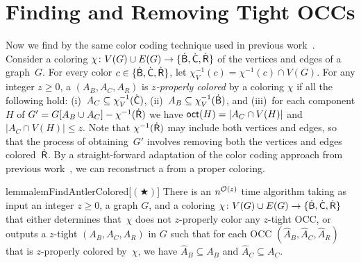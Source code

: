 \section{Finding and Removing Tight OCCs} \label{sec:tight:occs}


Now we find  by the same color coding technique used in previous work~\cite{DonkersJ24}.
Consider a coloring 
$\chi\colon V(G) \cup E(G) \to \{\mathsf{\dot{B}}, \mathsf{\dot{C}}, \mathsf{\dot{R}}\}$ of the vertices and edges of a graph~$G$.
For every color $c \in \{\mathsf{\dot{B}}, \mathsf{\dot{C}}, \mathsf{\dot{R}}\}$, let $\chi_V^{-1}(c) = \chi^{-1}(c) \cap V(G)$.
For any integer $z \geq 0$, a \zocc $(A_B,A_C,A_R)$ is \emph{$z$-properly colored} by
a coloring $\chi$ if all the following hold:
(i)~$A_C \subseteq \chi_V^{-1}(\mathsf{\dot{C}})$, (ii)~$A_B \subseteq \chi_V^{-1}(\mathsf{\dot{B}})$, and (iii)~for each component $H$ of $G'=G[A_B \cup A_C] - \chi^{-1}(\mathsf{\dot{R}})$ we have $\textnormal{\textsf{oct}}(H)=|A_C \cap V(H)|$ and~$|A_C \cap V(H)| \leq z$.
%
Note that $\chi^{-1}(\mathsf{\dot{R}})$ may include both vertices and edges, so that the process of obtaining~$G'$ involves removing both the vertices and edges colored~$\mathsf{\dot{R}}$.
By a straight-forward adaptation of the color coding approach from previous work~\cite[Lemma 6.2]{DonkersJ24}, we can reconstruct a \tocc from a proper coloring.

\begin{restatable}{lemma}{lemFindAntlerColored}[$(\bigstar)$]
\label{lem:find-antler-colored}
    There is an $n^{\mathcal{O}(z)}$ time algorithm taking as input an integer $z \geq 0$,
    a graph $G$, and a coloring $\chi \colon V(G) \cup E(G) \to \{\mathsf{\dot{B}}, \mathsf{\dot{C}}, \mathsf{\dot{R}}\}$
    that either determines that~$\chi$ does not $z$-properly color any $z$-tight OCC,
    or outputs a $z$-tight \occ $(A_B,A_C,A_R)$ in $G$ such that
    for each OCC $(\hat{A}_B, \hat{A}_C, \hat{A}_R)$ that is $z$-properly colored by~$\chi$,
    we have $\hat{A}_B \subseteq A_B$ and $\hat{A}_C \subseteq A_C$.
\end{restatable}

